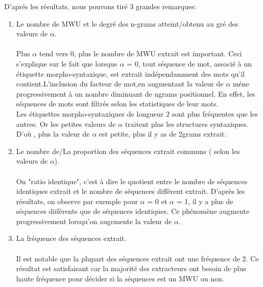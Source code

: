 \documentclass[a4paper,12pt]{article}
\begin{document}
	D'apr\'es les r\'esultats, nous pouvons tir\'e 3 grandes remarques:
	\begin{enumerate}
	\item Le nombre de MWU  et le degr\'e des n-grams atteint/obtenu  au gr\'e des valeurs de $\alpha$. \\
		\\Plus $\alpha$ tend vers 0, plus le nombre de MWU extrait est important. Ceci s'explique sur le fait que lorsque $\alpha$ = 0, tout s\'equence de mot, associ\'e \`a un \'etiquette morpho-syntaxique, est extrait ind\'ependamment des mots qu'il contient.L'inclusion du facteur de mot,en augmentant la valeur de $\alpha$ m\'ene progressivement \`a un nombre diminuant de ngrams positionnel. En effet, les s\'equences de mots sont filtr\'es selon les statistiques de leur mots. \\
		Les \'etiquettes morpho-syntaxiques de longueur 2 sont plus fr\'equentes que les autres. Or les petites valeurs de $\alpha$ traitent plus les structures syntaxiques. D'o\`u , plus la valeur de $\alpha$ est petite, plus il y as de 2grams extrait. 
		
	\item Le nombre de/La proportion des s\'equences extrait communs ( selon les valeurs de $\alpha$).\\ \\
On "ratio identique", c'est \`a dire le quotient entre le nombre  de s\'equences identiques extrait et le nombre de s\'equences diff\'erent extrait. D'apr\`es les r\'esultats, on observe par exemple pour $\alpha$ = 0 et $\alpha$ = 1, il y a plus de s\'equences diif\'erents que de s\'equences identiques. Ce ph\'enom\`ene augmente progressivement lorsqu'on augemente la valeur de $\alpha$.
	
	\item La fr\'equence des s\'equences extrait. 
	\\ \\Il est notable que la plupart des s\'equences extrait ont une fr\'equence de 2. Ce r\'esultat est satisfaisant car la majorit\'e des extracteurs ont besoin de plus haute fr\'equence pour d\'ecider si la s\'equences est un MWU ou non.
	\end{enumerate}
     
\end{document}
